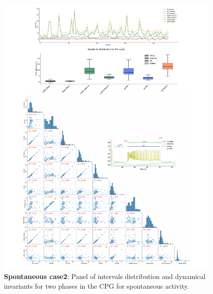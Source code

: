 \begin{figure}[htbp]
\centering
\includegraphics[width=1.1\textwidth]{./invariants/data/SUSSEX/prep2/images/2phases/panel_with_pairplot.pdf}
\caption{\textbf{Spontaneous case2}: Panel of intervals distribution and dynamical invariants for two phases in the CPG for spontaneous activity.}
\label{fig:prep2 2phase invariants pairplot}
\end{figure}


